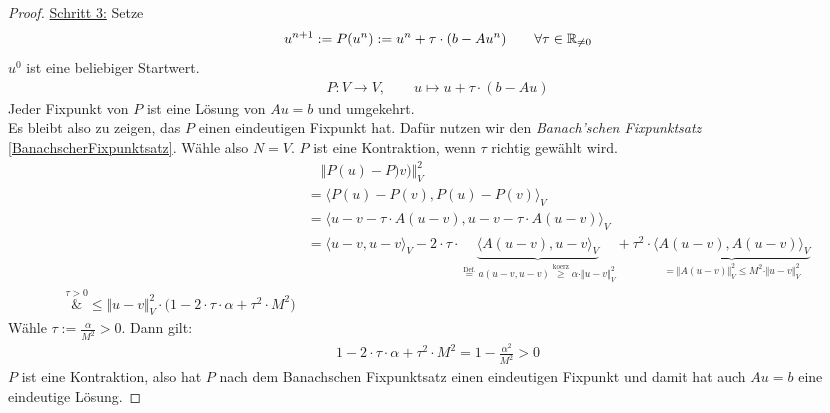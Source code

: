 \begin{proof}
	\underline{Schritt 3:} Setze
	\begin{align*}
		u^{n+1}:=P(u^n):=u^n+\tau\cdot(b-A u^n)\qquad\forall\tau\in\mathbb{R}_{\neq0}
	\end{align*}
	$u^0$ ist eine beliebiger Startwert.
	\begin{align*}
		P:V\to V,\qquad u\mapsto u+\tau\cdot(b-Au)
	\end{align*}
	Jeder Fixpunkt von $P$ ist eine Lösung von $Au=b$ und umgekehrt.\\
	Es bleibt also zu zeigen, das $P$ einen eindeutigen Fixpunkt hat.
	Dafür nutzen wir den \textit{Banach'schen Fixpunktsatz} \ref{BanachscherFixpunktsatz}.\nl
	Wähle also $N=V$.
	$P$ ist eine Kontraktion, wenn $\tau$ richtig gewählt wird.
	\begin{align*}
		&\quad\Vert P(u)-P)v)\Vert^2_V\\
		&=\big\langle P(u)-P(v),P(u)-P(v)\big\rangle_V\\
		&=\big\langle u-v-\tau\cdot A(u-v),u-v-\tau\cdot A(u-v)\big\rangle_V\\
		&=\langle u-v,u-v\rangle_V-2\cdot\tau\cdot\underbrace{\big\langle A(u-v),u-v\big\rangle_V}_{\stackrel{\text{Def.}}{=}a(u-v,u-v)\stackrel{\text{koerz}}{\geq}\alpha\cdot\Vert u-v\Vert^2_V}+\tau^2\cdot\underbrace{\big\langle A(u-v),A(u-v)\big\rangle_V}_{=\Vert A(u-v)\Vert^2_V\leq M^2\cdot\Vert u-v\Vert^2_V}\\
		\overset{\tau>0}&{\leq}
		\Vert u-v\Vert^2_V\cdot\big(1-2\cdot\tau\cdot\alpha+\tau^2\cdot M^2\big)
	\end{align*}
	Wähle $\tau:=\frac{\alpha}{M^2}>0$.
	Dann gilt:
	\begin{align*}
		1-2\cdot\tau\cdot\alpha+\tau^2\cdot M^2=1-\frac{\alpha^2}{M^2}>0
	\end{align*}
	$P$ ist eine Kontraktion, also hat $P$ nach dem Banachschen Fixpunktsatz einen eindeutigen Fixpunkt und damit hat auch $Au=b$ eine eindeutige Lösung.
\end{proof}

